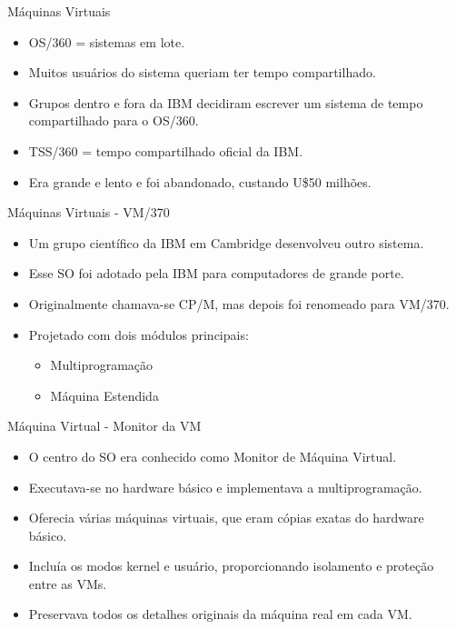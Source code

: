 \documentclass{beamer}
\begin{document}
\begin{frame}{Máquinas Virtuais}
    \begin{itemize}
        \item OS/360 = sistemas em lote.
        \item Muitos usuários do sistema queriam ter tempo compartilhado.
        \item Grupos dentro e fora da IBM decidiram escrever um sistema de tempo compartilhado para o OS/360.
        \item TSS/360 = tempo compartilhado oficial da IBM.
        \item Era grande e lento e foi abandonado, custando U\$50 milhões.
    \end{itemize}
\end{frame}
\begin{frame}{Máquinas Virtuais - VM/370}
    \begin{itemize}
        \item Um grupo científico da IBM em Cambridge desenvolveu outro sistema.
        \item Esse SO foi adotado pela IBM para computadores de grande porte.
        \item Originalmente chamava-se CP/M, mas depois foi renomeado para VM/370.
        \item Projetado com dois módulos principais:
              \begin{itemize}
                  \item Multiprogramação
                  \item Máquina Estendida
              \end{itemize}
    \end{itemize}
\end{frame}
\begin{frame}{Máquina Virtual - Monitor da VM}
    \begin{itemize}
        \item O centro do SO era conhecido como Monitor de Máquina Virtual.
        \item Executava-se no hardware básico e implementava a multiprogramação.
        \item Oferecia várias máquinas virtuais, que eram cópias exatas do hardware básico.
        \item Incluía os modos kernel e usuário, proporcionando isolamento e proteção entre as VMs.
        \item Preservava todos os detalhes originais da máquina real em cada VM.
    \end{itemize}
\end{frame}
\end{document}
